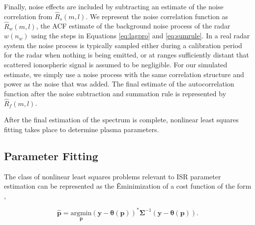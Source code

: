 



Finally, noise effects are included by subtracting an estimate of the noise correlation from $\widehat{R}_s(m,l)$.  We represent the noise correlation function as $\widehat{R}_w(m,l)$, the ACF estimate of the background noise process of the radar $w(n_w)$ using the steps in Equations \ref{eq:lagpro} and \ref{eq:sumrule}. In a real radar system the noise process is typically sampled either during a calibration period for the radar when nothing is being emitted, or at ranges sufficiently distant that scattered ionospheric signal is assumed to be negligible. For our simulated estimate, we simply use a noise process with the same correlation structure and power as the noise that was added. The final estimate of the autocorrelation function after the noise subtraction and summation rule is represented by $\widehat{R}_f(m,l)$.


After the final estimation of the spectrum is complete, nonlinear least squares fitting takes place to determine plasma parameters.  

\subsection{Parameter Fitting}
The class of nonlinear least squares problems relevant to ISR parameter estimation can be represented as the Êminimization of a cost function of the form \cite{kayvol1},

\begin{equation}
	\mathbf{\hat{p}}= \underset{\mathbf{p}}{\text{argmin}} (\mathbf{y}-\bm{\theta}(\mathbf{p}))^*\bm{\Sigma}^{-1}(\mathbf{y}-\bm{\theta}(\mathbf{p})).
\label{nlls}
\end{equation}

